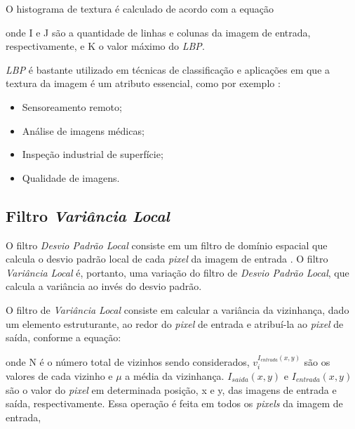 \par O histograma de textura é calculado de acordo com a equação 

\noindent onde I e J são a quantidade de linhas e colunas da imagem de entrada, respectivamente, e K o valor máximo do \textit{\acrshort{LBP}}.

\par \textit{\acrshort{LBP}} é bastante utilizado em técnicas de classificação e aplicações em que a textura da imagem é um atributo essencial, como por exemplo \cite{ojala2002LBP}:

\begin{itemize}
    \item Sensoreamento remoto;
    \item Análise de imagens médicas;
    \item Inspeção industrial de superfície;
    \item Qualidade de imagens.
\end{itemize}


\subsection{Filtro \textit{Variância Local}}\label{sec:dom_esp:filtro_std}

\par O filtro \textit{Desvio Padrão Local} consiste em um filtro de domínio espacial que calcula o desvio padrão local de cada \textit{pixel} da imagem de entrada \cite{stdfilt}. O filtro \textit{Variância Local} é, portanto, uma variação do filtro de \textit{Desvio Padrão Local}, que calcula a variância ao invés do desvio padrão.

\par O filtro de \textit{Variância Local} consiste em calcular a variância da vizinhança, dado um elemento estruturante, ao redor do \textit{pixel} de entrada e atribuí-la ao \textit{pixel} de saída, conforme a equação:


\noindent onde N é o número total de vizinhos sendo considerados, $v_{i}^{I_{entrada}(x,y)}$ são os valores de cada vizinho e $\mu$ a média da vizinhança. $I_{saida}(x,y)$ e $I_{entrada}(x,y)$ são o valor do \textit{pixel} em determinada posição, x e y, das imagens de entrada e saída, respectivamente. Essa operação é feita em todos os \textit{pixels} da imagem de entrada,

